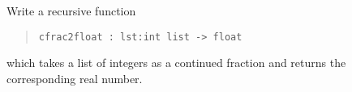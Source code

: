Write a recursive function
\begin{quote}
  \lstinline{cfrac2float : lst:int list -> float}
\end{quote}
which takes a list of integers as a continued fraction and returns the
corresponding real number.
